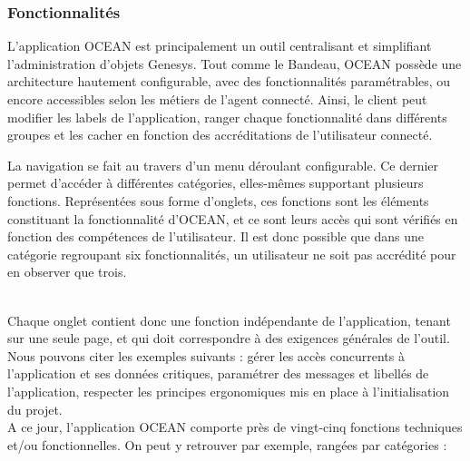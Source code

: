 \documentclass{rapport}
\begin{document}
\subsubsection{Fonctionnalités}

L'application OCEAN est principalement un outil centralisant et simplifiant l'administration d'objets Genesys. Tout comme le Bandeau, OCEAN possède une architecture hautement configurable, avec des fonctionnalités paramétrables, ou encore accessibles selon les métiers de l’agent connecté. Ainsi, le client peut modifier les labels de l'application, ranger chaque fonctionnalité dans différents groupes et les cacher en fonction des accréditations de l'utilisateur connecté.


\begin{minipage}{0.55\textwidth}

La navigation se fait au travers d'un menu déroulant configurable. Ce dernier permet d'accéder à différentes catégories, elles-mêmes supportant plusieurs fonctions. Représentées sous forme d'onglets, ces fonctions sont les éléments constituant la fonctionnalité d'OCEAN, et ce sont leurs accès qui sont vérifiés en fonction des compétences de l'utilisateur. Il est donc possible que dans une catégorie regroupant six fonctionnalités, un utilisateur ne soit pas accrédité pour en observer que trois.

\end{minipage}
\begin{minipage}{0.45\textwidth}
\end{minipage}
\vspace{5mm} %
\noindent
\\

Chaque onglet contient donc une fonction indépendante de l'application, tenant sur une seule page, et qui doit correspondre à des exigences générales de l'outil. Nous pouvons citer les exemples suivants : gérer les accès concurrents à l'application et ses données critiques, paramétrer des messages et libellés de l'application, respecter les principes ergonomiques mis en place à l'initialisation du projet.\\

A ce jour, l'application OCEAN comporte près de vingt-cinq fonctions techniques et/ou fonctionnelles. On peut y retrouver par exemple, rangées par catégories :
\end{document}
